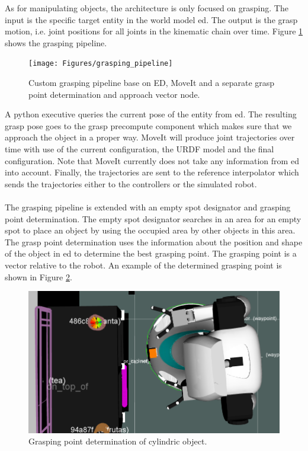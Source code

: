 As for manipulating objects, the architecture is only focused on grasping. The input is the specific target entity in the world model \acrshort{ed}. The output is the grasp motion, i.e. joint positions for all joints in the kinematic chain over time. Figure \ref{fig:grasping_pipeline} shows the grasping pipeline.
\begin{figure}[h]
    \centering
	\texttt{[image: Figures/grasping\_pipeline]}
	\caption{Custom grasping pipeline base on ED, MoveIt and a separate grasp point determination and approach vector node.}
	\label{fig:grasping_pipeline}
\end{figure}
A python executive queries the current pose of the entity from \acrshort{ed}. The resulting grasp pose goes to the grasp precompute component which makes sure that we approach the object in a proper way. MoveIt will produce joint trajectories over time with use of the current configuration, the URDF model and the final configuration. Note that MoveIt currently does not take any information from \acrshort{ed} into account. Finally, the trajectories are sent to the reference interpolator which sends the trajectories either to the controllers or the simulated robot.
\\\\
The grasping pipeline is extended with an empty spot designator and grasping point determination. The empty spot designator searches in an area for an empty spot to place an object by using the occupied area by other objects in this area.
\\
The grasp point determination uses the information about the position and shape of the object in \acrshort{ed} to determine the best grasping point. The grasping point is a vector relative to the robot. An example of the determined grasping point is shown in Figure \ref{fig:grasping_point_determination}.
 \begin{figure}[h]
    \centering
	\includegraphics[width = 0.8\linewidth]{Figures/grasp_point_determination}
	\caption{Grasping point determination of cylindric object.}
	\label{fig:grasping_point_determination}
\end{figure}